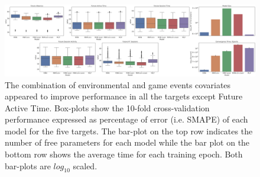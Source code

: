 \begin{figure}[h]
\centering
\includegraphics[width=\textwidth]{images/chapter_3/performance_exploded_33.png}
\caption[\textbf{Dis-aggregated comparison of models' performance}]{The combination of environmental and game events covariates appeared to improve performance in all the targets except Future Active Time. Box-plots show the 10-fold cross-validation performance expressed as percentage of error (i.e. SMAPE) of each model for the five targets. The bar-plot on the top row indicates the number of free parameters for each model while the bar plot on the bottom row shows the average time for each training epoch. Both bar-plots are $log_{10}$ scaled.}
\label{model_comp_expl_33} 
\end{figure}


